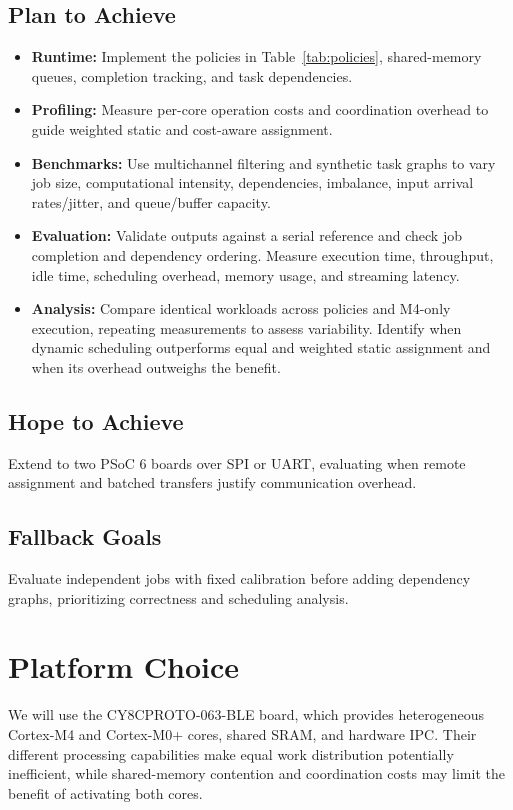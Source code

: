 \documentclass[11pt]{article}
\begin{document}
\subsection{Plan to Achieve}
\begin{itemize}
    \item \textbf{Runtime:}
    Implement the policies in Table~\ref{tab:policies}, shared-memory
    queues, completion tracking, and task dependencies.

    \item \textbf{Profiling:}
    Measure per-core operation costs and coordination overhead to
    guide weighted static and cost-aware assignment.

    \item \textbf{Benchmarks:}
    Use multichannel filtering and synthetic task graphs to vary job
    size, computational intensity, dependencies, imbalance, input
    arrival rates/jitter, and queue/buffer capacity.

    \item \textbf{Evaluation:}
    Validate outputs against a serial reference and check job completion
    and dependency ordering. Measure execution time, throughput, idle
    time, scheduling overhead, memory usage, and streaming latency.

    \item \textbf{Analysis:}
    Compare identical workloads across policies and M4-only execution,
    repeating measurements to assess variability. Identify when dynamic
    scheduling outperforms equal and weighted static assignment and
    when its overhead outweighs the benefit.
\end{itemize}

\subsection{Hope to Achieve}
Extend to two PSoC 6 boards over SPI or UART, evaluating when remote
assignment and batched transfers justify communication overhead.

\subsection{Fallback Goals}
Evaluate independent jobs with fixed calibration before adding
dependency graphs, prioritizing correctness and scheduling analysis.

\section{Platform Choice}
We will use the CY8CPROTO-063-BLE board, which provides heterogeneous
Cortex-M4 and Cortex-M0+ cores, shared SRAM, and hardware IPC. Their
different processing capabilities make equal work distribution
potentially inefficient, while shared-memory contention and
coordination costs may limit the benefit of activating both cores.
\end{document}
